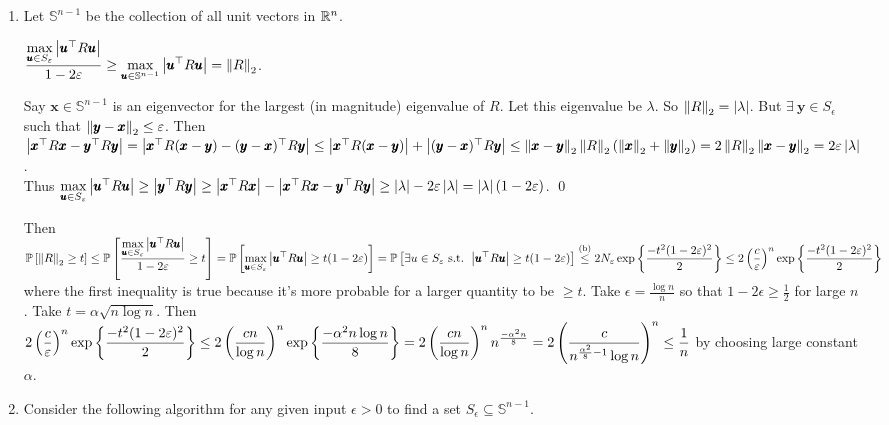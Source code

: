 \begin{enumerate}[leftmargin=*, label=(\alph*)]
\item 
Let $\mathbb S^{n-1}$ be the collection of all unit vectors in $\mathbb{R}^{n}$. 
\begin{lemma}
$\displaystyle\frac{\max\limits_{\pmb u\in S_{\varepsilon}}\left| \pmb u^{\top}R\pmb u \right|}{1-2\varepsilon} \ge \max_{\pmb u\in \mathbb S^{n-1}}\left| \pmb u^{\top}R\pmb u \right| = \left\lVert R \right\rVert_{2}$.
\end{lemma}
\begin{pf}
Say $\pmb x\in\mathbb S^{n-1}$ is an eigenvector for the largest (in magnitude) eigenvalue of $R$. Let this eigenvalue be $\lambda$. So $\left\lVert R \right\rVert_{2} = \left| \lambda \right|$. But $\exists~ \pmb y\in S_{\epsilon}$ such that $\left\lVert \pmb y-\pmb x \right\rVert_{2}\le \varepsilon$. Then $\left| \pmb x^{\top}R\pmb x - \pmb y^{\top}R\pmb y \right| = \left| \pmb x^{\top}R(\pmb x-\pmb y) - (\pmb y-\pmb x)^{\top}R\pmb y \right| \le \left| \pmb x^{\top}R(\pmb x-\pmb y) \right| + \left| (\pmb y-\pmb x)^{\top}R\pmb y \right| \le \left\lVert \pmb x-\pmb y \right\rVert_{2} \left\lVert R \right\rVert_{2}(\left\lVert \pmb x \right\rVert_{2} + \left\lVert \pmb y \right\rVert_{2}) = 2 \left\lVert R \right\rVert_{2}\left\lVert \pmb x-\pmb y \right\rVert_{2} = 2\varepsilon\left| \lambda \right|$. \\
Thus $\max\limits_{\pmb u\in S_{\varepsilon}}\left| \pmb u^{\top}R\pmb u \right| \ge \left| \pmb y^{\top}R\pmb y \right| \ge \left| \pmb x^{\top}R\pmb x \right| - \left| \pmb x^{\top}R\pmb x - \pmb y^{\top}R\pmb y \right| \ge \left| \lambda \right| - 2\varepsilon\left| \lambda \right| = \left| \lambda \right|(1-2\varepsilon)$.
\qed\end{pf} 
Then $\displaystyle\mathbb P\left[ \left\lVert R \right\rVert_{2} \ge t \right] \le \mathbb P\left[ \frac{\max\limits_{\pmb u\in S_{\varepsilon}}\left| \pmb u^{\top}R\pmb u \right|}{1-2\varepsilon} \ge t \right] = \mathbb P\left[ \max\limits_{\pmb u\in S_{\varepsilon}}\left| \pmb u^{\top}R\pmb u \right| \ge t(1-2\varepsilon) \right]= \\\mathbb P\left[ \exists u\in S_{\varepsilon} \text{ s.t. } \left| \pmb u^{\top}R\pmb u \right| \ge t(1-2\varepsilon) \right] \stackrel{\text{(b)}}{\le} 2N_{\varepsilon}\exp\left\{\frac{-t^{2}(1-2\varepsilon)^{2}}{2}\right\} \le 2\left(\frac c{\varepsilon}\right)^{n}\exp\left\{\frac{-t^{2}(1-2\varepsilon)^{2}}{2}\right\}$ where the first inequality is true because it's more probable for a larger quantity to be $\ge t$. 
Take $\epsilon = \frac{\log n}{ n}$ so that $1-2\epsilon\ge \frac{1}{2}$ for large $n$. Take $t=\alpha\sqrt{ n\log n}$. Then $\displaystyle 2\left(\frac c{\varepsilon}\right)^{n}\exp\left\{\frac{-t^{2}(1-2\varepsilon)^{2}}{2}\right\} \le 2\left(\frac{cn}{\log n}\right)^{n}\exp\left\{\frac{-\alpha^{2}n\log n}{8}\right\} = 2\left(\frac{cn}{\log n}\right)^{n} n^{\frac{-\alpha^{2}n}{8}}  = 2\left(\frac{c}{n^{\frac{\alpha^{2}}8-1}\log n}\right)^{n} \le \frac1n$ by choosing large constant $\alpha$.
\item Consider the following algorithm for any given input $\epsilon>0$ to find a set $S_{\epsilon}\subseteq \mathbb S^{n-1}$. 

\end{enumerate}
